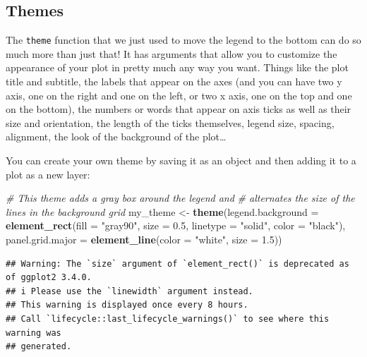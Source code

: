 \documentclass[
]{book}
\newenvironment{Shaded}{\begin{snugshade}}{\end{snugshade}}
\newcommand{\AttributeTok}[1]{\textcolor[rgb]{0.13,0.29,0.53}{#1}}
\newcommand{\CommentTok}[1]{\textcolor[rgb]{0.56,0.35,0.01}{\textit{#1}}}
\newcommand{\FloatTok}[1]{\textcolor[rgb]{0.00,0.00,0.81}{#1}}
\newcommand{\FunctionTok}[1]{\textcolor[rgb]{0.13,0.29,0.53}{\textbf{#1}}}
\newcommand{\NormalTok}[1]{#1}
\newcommand{\OtherTok}[1]{\textcolor[rgb]{0.56,0.35,0.01}{#1}}
\newcommand{\StringTok}[1]{\textcolor[rgb]{0.31,0.60,0.02}{#1}}
\begin{document}
\hypertarget{themes}{%
\subsection{Themes}\label{themes}}

The \texttt{theme} function that we just used to move the legend to the bottom can do
so much more than just that! It has arguments that allow you to customize the
appearance of your plot in pretty much any way you want. Things like the plot
title and subtitle, the labels that appear on the axes (and you can have two
y axis, one on the right and one on the left, or two x axis, one on the top and
one on the bottom), the numbers or words that appear on axis ticks as well as
their size and orientation, the length of the ticks themselves, legend size,
spacing, alignment, the look of the background of the plot\ldots{}

You can create your own theme by saving it as an object and then adding it to
a plot as a new layer:

\begin{Shaded}
\begin{Highlighting}[]
\CommentTok{\# This theme adds a gray box around the legend and }
\CommentTok{\# alternates the size of the lines in the background grid}
\NormalTok{my\_theme }\OtherTok{\textless{}{-}} \FunctionTok{theme}\NormalTok{(}\AttributeTok{legend.background =} \FunctionTok{element\_rect}\NormalTok{(}\AttributeTok{fill =} \StringTok{"gray90"}\NormalTok{,}
                                                   \AttributeTok{size =} \FloatTok{0.5}\NormalTok{,}
                                                   \AttributeTok{linetype =} \StringTok{"solid"}\NormalTok{,}
                                                   \AttributeTok{color =} \StringTok{"black"}\NormalTok{),}
                  \AttributeTok{panel.grid.major =} \FunctionTok{element\_line}\NormalTok{(}\AttributeTok{color =} \StringTok{"white"}\NormalTok{,}
                                                  \AttributeTok{size =} \FloatTok{1.5}\NormalTok{))}
\end{Highlighting}
\end{Shaded}

\begin{verbatim}
## Warning: The `size` argument of `element_rect()` is deprecated as of ggplot2 3.4.0.
## i Please use the `linewidth` argument instead.
## This warning is displayed once every 8 hours.
## Call `lifecycle::last_lifecycle_warnings()` to see where this warning was
## generated.
\end{verbatim}
\end{document}
